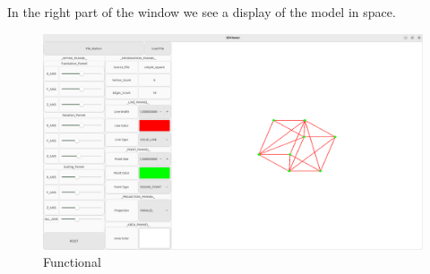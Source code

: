 \documentclass[12pt, legalpaper]{report}
\begin{document}
In the right part of the window we see a display of the model in space.

\newpage


\begin{figure}[h]
	\centering
	\vspace*{\fill}
	\includegraphics[width=1.3\textwidth]{2}
	\vspace*{\fill}
	\caption{Functional}
	\label{fig:func}
\end{figure}
\end{document}
